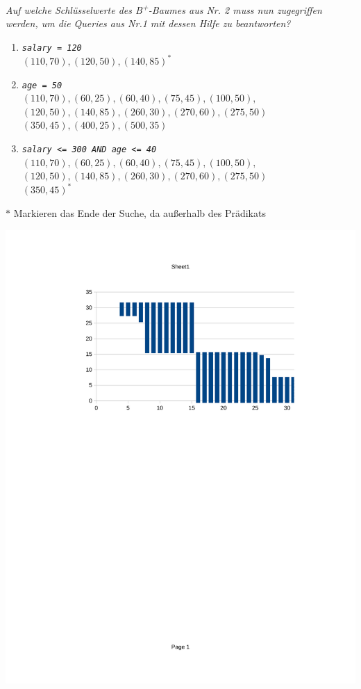 \documentclass{uni_tue_template}
\newcommand{\code}[1]{\texttt{{\footnotesize #1}}}
\begin{document}
  \item \emph{Auf welche Schlüsselwerte des B\textsuperscript{+}-Baumes aus Nr. 2 muss nun zugegriffen werden, um die Queries aus Nr.1 mit dessen Hilfe zu beantworten?}
  \begin{enumerate}[{(}a{)}]
    \item \emph{\code{salary = 120}}\\
    $(110,70),(120,50),(140,85)^*$
    \item \emph{\code{age = 50}}\\
    $(110,70),(60,25),(60,40),(75,45),(100,50),$\\ $(120,50),(140,85),(260,30),(270,60),(275,50)$\\
    $(350,45),(400,25),(500,35)$
    \item \emph{\code{salary <= 300 AND age <= 40}}\\
    $(110,70),(60,25),(60,40),(75,45),(100,50),$\\ $(120,50),(140,85),(260,30),(270,60),(275,50)$\\
    $(350,45)^*$
  \end{enumerate}
  $*$ Markieren das Ende der Suche, da außerhalb des Prädikats
\subExEnd{}
%
\newpage 
%
\exercise{}

\includegraphics[]{./zindex.pdf}\\
\end{document}
